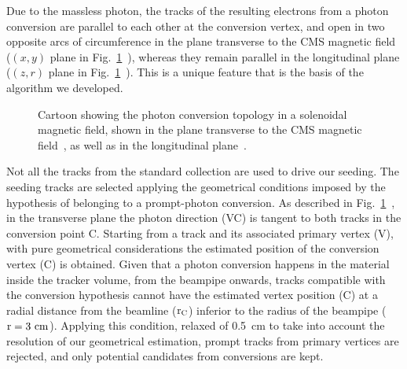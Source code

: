 \documentclass[a4paper]{jpconf}
\begin{document}
Due to the massless photon, the tracks of the resulting electrons from a photon conversion are parallel to each other at the conversion vertex, and open in two opposite arcs of circumference in the  plane transverse to the CMS magnetic field ($(x,y)$ plane in Fig.~\ref{fig:algo}~),
whereas they  remain parallel in the  longitudinal plane ($(z,r)$ plane in Fig.~\ref{fig:algo}~). This is a unique feature that is the basis of the algorithm we developed. 


\begin{figure}[]
\centering
{}
\caption{Cartoon showing the photon conversion topology in a solenoidal magnetic field,
shown in the plane transverse  to the CMS magnetic field~, as well as  in the longitudinal plane~.}

\label{fig:algo}
\end{figure}

Not all the tracks from  the standard collection are used to drive our seeding. The seeding tracks are selected applying the geometrical conditions imposed by the hypothesis of belonging to a prompt-photon conversion. 
%
As described in Fig.~\ref{fig:algo}~, in the transverse plane the photon direction (VC) is tangent to both tracks in the conversion point C. Starting from a track and its associated primary vertex (V), with pure geometrical considerations the estimated position of the conversion vertex (C) is obtained. Given that a photon conversion happens in the material inside the tracker volume, from the beampipe onwards, tracks compatible with the conversion hypothesis cannot have the estimated vertex position (C) at a radial distance from the beamline ($\rm r_C$) inferior to the radius of the beampipe ($\rm r=3~cm$). Applying this condition, relaxed of 0.5~cm to take into account the resolution of our geometrical estimation,  prompt tracks from primary vertices are rejected, and only potential candidates from conversions are kept.
\end{document}
